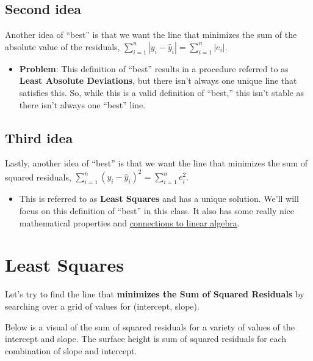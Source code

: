 \documentclass[]{book}
\providecommand{\tightlist}{%
  \setlength{\itemsep}{0pt}\setlength{\parskip}{0pt}}
\begin{document}
\hypertarget{second-idea}{%
\subsection{Second idea}\label{second-idea}}

Another idea of ``best'' is that we want the line that minimizes the sum of the absolute value of the residuals, \(\sum_{i=1}^n |y_i - \hat{y}_i| = \sum_{i=1}^n |e_i|\).

\begin{itemize}
\tightlist
\item
  \textbf{Problem}: This definition of ``best'' results in a procedure referred to as \textbf{Least Absolute Deviations}, but there isn't always one unique line that satisfies this. So, while this is a valid definition of ``best,'' this isn't stable as there isn't always one ``best'' line.
\end{itemize}

\hypertarget{third-idea}{%
\subsection{Third idea}\label{third-idea}}

Lastly, another idea of ``best'' is that we want the line that minimizes the sum of squared residuals, \(\sum_{i=1}^n (y_i - \hat{y}_i)^2= \sum_{i=1}^n e_i^2\).

\begin{itemize}
\tightlist
\item
  This is referred to as \textbf{Least Squares} and has a unique solution. We'll will focus on this definition of ``best'' in this class. It also has some really nice mathematical properties and \href{https://medium.com/@andrew.chamberlain/the-linear-algebra-view-of-least-squares-regression-f67044b7f39b}{connections to linear algebra}.
\end{itemize}

\hypertarget{least-squares}{%
\section{Least Squares}\label{least-squares}}

Let's try to find the line that \textbf{minimizes the Sum of Squared Residuals} by searching over a grid of values for (intercept, slope).

Below is a visual of the sum of squared residuals for a variety of values of the intercept and slope. The surface height is sum of squared residuals for each combination of slope and intercept.
\end{document}

